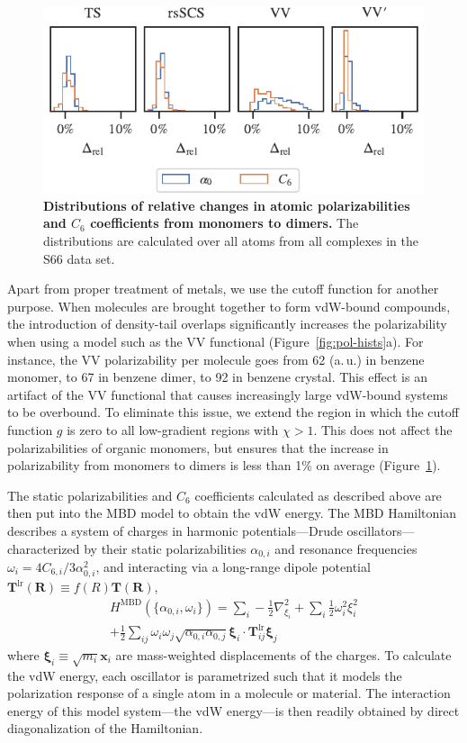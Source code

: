 \begin{figure}[t!]
\centering
\includegraphics{../media/pol-shifts.pdf}
\caption{\textbf{Distributions of relative changes in atomic polarizabilities and $C_6$ coefficients from monomers to dimers.}
The distributions are calculated over all atoms from all complexes in the S66 data set.
}\label{fig:pol-shifts}
\end{figure}

Apart from proper treatment of metals, we use the cutoff function for another purpose.
When molecules are brought together to form vdW-bound compounds, the introduction of density-tail overlaps significantly increases the polarizability when using a model such as the VV functional (Figure~\ref{fig:pol-hists}a).
For instance, the VV polarizability per molecule goes from 62 (a.\,u.) in benzene monomer, to 67 in benzene dimer, to 92 in benzene crystal.
This effect is an artifact of the VV functional that causes increasingly large vdW-bound systems to be overbound.
To eliminate this issue, we extend the region in which the cutoff function $g$ is zero to all low-gradient regions with $\chi>1$.
This does not affect the polarizabilities of organic monomers, but ensures that the increase in polarizability from monomers to dimers is less than 1\% on average (Figure~\ref{fig:pol-shifts}).

The static polarizabilities and $C_6$ coefficients calculated as described above are then put into the MBD model to obtain the vdW energy.
The MBD Hamiltonian describes a system of charges in harmonic potentials---Drude oscillators---characterized by their static polarizabilities $\alpha_{0,i}$ and resonance frequencies $\omega_i=4C_{6,i}/3\alpha_{0,i}^2$, and interacting via a long-range dipole potential $\mathbf T^\mathrm{lr}(\mathbf R)\equiv f(R)\mathbf T(\mathbf R)$,
\begin{multline}
  H^\text{MBD}(\{\alpha_{0,i},\omega_i\})=\sum_i-\frac12\nabla_{\xi_i}^2+\sum_i\frac12\omega_i^2\xi_i^2 \\
  +\frac12\sum_{ij}\omega_i\omega_j\sqrt{\alpha_{0,i}\alpha_{0,j}}\boldsymbol{\xi}_i\cdot\mathbf T^\mathrm{lr}_{ij}\boldsymbol{\xi}_j
\end{multline}
where $\boldsymbol\xi_i\equiv\sqrt{m_i}\mathbf x_i$ are mass-weighted displacements of the charges.
To calculate the vdW energy, each oscillator is parametrized such that it models the polarization response of a single atom in a molecule or material.
The interaction energy of this model system---the vdW energy---is then readily obtained by direct diagonalization of the Hamiltonian.

